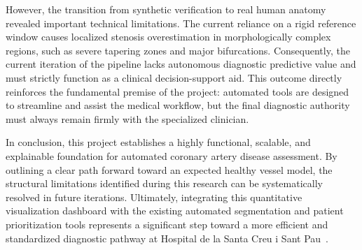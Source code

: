 However, the transition from synthetic verification to real human anatomy revealed important technical limitations. The current reliance on a rigid reference window causes localized stenosis overestimation in morphologically complex regions, such as severe tapering zones and major bifurcations. Consequently, the current iteration of the pipeline lacks autonomous diagnostic predictive value and must strictly function as a clinical decision-support aid. This outcome directly reinforces the fundamental premise of the project: automated tools are designed to streamline and assist the medical workflow, but the final diagnostic authority must always remain firmly with the specialized clinician.

In conclusion, this project establishes a highly functional, scalable, and explainable foundation for automated coronary artery disease assessment. By outlining a clear path forward toward an expected healthy vessel model, the structural limitations identified during this research can be systematically resolved in future iterations. Ultimately, integrating this quantitative visualization dashboard with the existing automated segmentation and patient prioritization tools represents a significant step toward a more efficient and standardized diagnostic pathway at Hospital de la Santa Creu i Sant Pau~\cite{acebes2024}.
